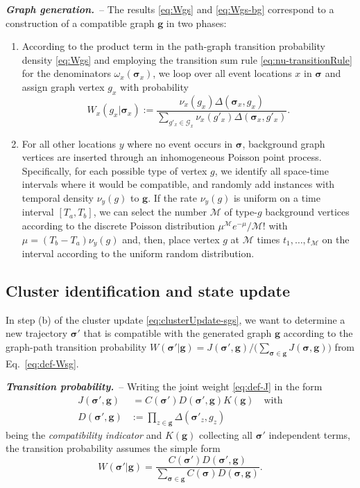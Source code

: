 \documentclass[english,10pt,aps,pra,twocolumn,superscriptaddress,floatfix,fleqn]{revtex4-2}
\newcommand{\mc}[1]{\mathcal{#1}}
\renewcommand{\vec}[1]{{\boldsymbol{#1}}}
\newcommand{\G} {\mc{G}}
\newcommand{\vg}{\vec{g}}
\newcommand{\vs}{\vec{\sigma}}
\newcommand{\Nb}{\mc{M}}
\newcommand{\Emph}[1]{\emph{\textbf{#1}}}
\begin{document}
\Emph{Graph generation.}~-- The results \eqref{eq:Wgs} and \eqref{eq:Wgs-bg} correspond to a construction of a compatible graph $\vg$ in two phases:
\begin{enumerate}
 \item[(i)]
 According to the product term in the path-graph transition probability density \eqref{eq:Wgs} and employing the transition sum rule \eqref{eq:nu-transitionRule} for the denominators $\omega_x(\vs_x)$, we loop over all event locations $x$ in $\vs$ and assign graph vertex $g_x$ with probability
 \begin{equation}
	W_x(g_x|\vs_x) := \frac{\nu_x(g_x)\Delta(\vs_x,g_x)}{\sum_{g'_x\in\G_x} \nu_x(g'_x)\Delta(\vs_x,g'_x)}.
 \end{equation}
 \item[(ii)]
 For all other locations $y$ where no event occurs in $\vs$, background graph vertices are inserted through an inhomogeneous Poisson point process. Specifically, for each possible type of vertex $g$, we identify all space-time intervals where it would be compatible, and randomly add instances with temporal density $\nu_y(g)$ to $\vg$. If the rate $\nu_y(g)$ is uniform on a time interval $[T_a,T_b]$, we can select the number $\Nb$ of type-$g$ background vertices according to the discrete Poisson distribution $\mu^{\Nb}e^{-\mu}/\Nb!$ with $\mu=(T_b-T_a)\nu_y(g)$ and, then, place vertex $g$ at $\Nb$ times $t_1,\dotsc,t_\Nb$ on the interval according to the uniform random distribution.
\end{enumerate}

\subsection{Cluster identification and state update}\label{sec:clusterIdentify}
In step (b) of the cluster update \eqref{eq:clusterUpdate-sgs}, we want to determine a new trajectory $\vs'$ that is compatible with the generated graph $\vg$ according to the graph-path transition probability $W(\vs'|\vg)= J(\vs',\vg)/\big(\sum_{\vs\in\vg}J(\vs,\vg)\big)$ from Eq.~\eqref{eq:def-Wsg}. 

\Emph{Transition probability.}~-- Writing the joint weight \eqref{eq:def-J} in the form
\begin{align}
	J(\vs',\vg) &\,= C(\vs')D(\vs',\vg) K(\vg)\quad\text{with}\\
	D(\vs',\vg) &:= \prod_{z\in\vg}\Delta(\vs'_z,g_z)
\end{align}
being the \emph{compatibility indicator} and $K(\vg)$ collecting all $\vs'$ independent terms, the transition probability assumes the simple form
\begin{equation}\label{eq:Wsg}
	W(\vs'|\vg)= \frac{C(\vs')D(\vs',\vg)}{\sum_{\vs\in\vg} C(\vs)D(\vs,\vg)}.
\end{equation}
\end{document}

